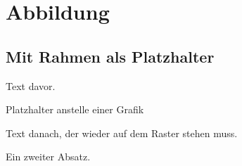 \documentclass{swisstex}
\begin{document}
\section{Abbildung}
\subsection{Mit Rahmen als Platzhalter}
Text davor.
\begin{swissfigure}{Platzhalter anstelle einer Grafik}
\fboxsep=0pt\fbox{\rule{0pt}{40mm}\rule{\dimexpr\textcolumn-2\fboxrule\relax}{0pt}}
\end{swissfigure}
Text danach, der wieder auf dem Raster stehen muss.

Ein zweiter Absatz.
\end{document}
